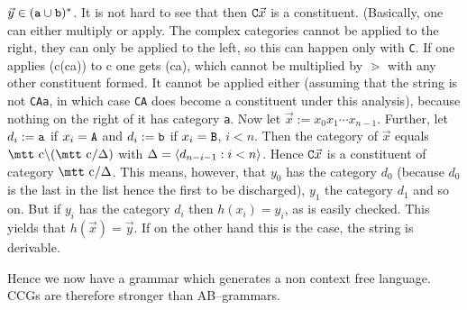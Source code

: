 $\vec{y} \in (\mbox{\tt a}\cup\mbox{\tt b})^{\ast}$.
It is not hard to see that then $\mbox{\tt C}\vec{x}$ is a
constituent. (Basically, one can either multiply or apply. 
The complex categories cannot be applied to the right, they 
can only be applied to the left, so this can happen only with 
{\tt C}. If one applies {\mtt (c{\tb}(c{\tf}a))} to {\mtt c} 
one gets {\mtt (c{\tf}a)}, which cannot be multiplied by 
$\gtrdot$ with any other constituent formed. It 
cannot be applied either (assuming that the string is not 
{\tt CAa}, in which case {\tt CA} does become a constituent under 
this analysis), because nothing on the right of it has category 
{\tt a}. Now let $\vec{x} := x_0x_1\dotsb x_{n-1}$. 
Further, let $d_i := \mbox{\tt a}$ if $x_i = \mbox{\tt A}$ and 
$d_i := \mbox{\tt b}$ if $x_i = \mbox{\tt B}$, $i < n$. Then the 
category of $\vec{x}$ equals 
$\mbox{\mtt c}\backslash (\mbox{\mtt c}/\Delta)$ with 
$\Delta = \langle d_{n-i-1}: i < n\rangle$. Hence $\mbox{\tt C}\vec{x}$ 
is a constituent of category $\mbox{\mtt c}/\Delta$. This 
means, however, that $y_0$ has the category $d_0$ (because 
$d_0$ is the last in the list hence the first to be discharged),
$y_1$ the category $d_1$ and so on. But if $y_i$ has the
category $d_i$ then $h(x_i) = y_i$, as is easily checked.
This yields that $h(\vec{x}) = \vec{y}$. If on the other
hand this is the case, the string is derivable.
\proofend

Hence we now have a grammar which generates a non context free
language. CCGs are therefore stronger than AB--grammars.

